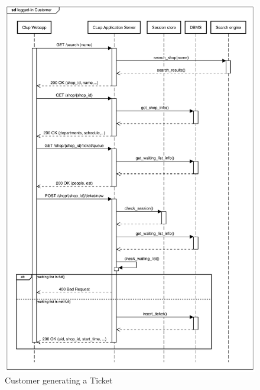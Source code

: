 \begin{figure}[H]
    \centering
    \includegraphics[width=1\textwidth]{Images/runtime_ticket.pdf}
    \caption{Customer generating a Ticket}
\end{figure}
